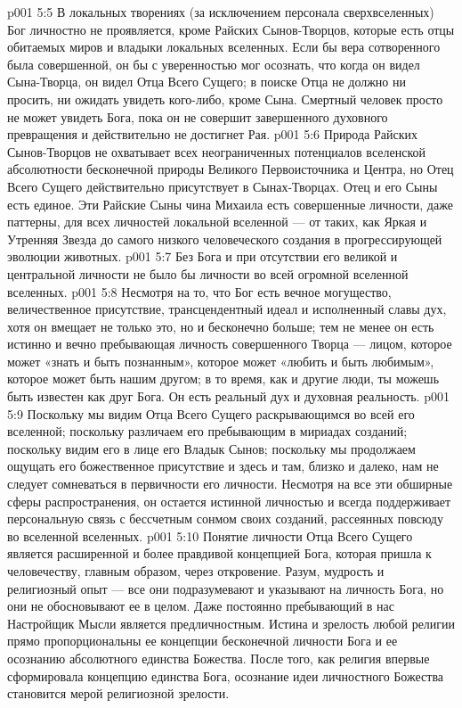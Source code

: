 \vs p001 5:5 \pc В локальных творениях (за исключением персонала сверхвселенных) Бог личностно не проявляется, кроме Райских Сынов\hyp{}Творцов, которые есть отцы обитаемых миров и владыки локальных вселенных. Если бы вера сотворенного была совершенной, он бы с уверенностью мог осознать, что когда он видел Сына\hyp{}Творца, он видел Отца Всего Сущего; в поиске Отца не должно ни просить, ни ожидать увидеть кого\hyp{}либо, кроме Сына. Смертный человек просто не может увидеть Бога, пока он не совершит завершенного духовного превращения и действительно не достигнет Рая.
\vs p001 5:6 Природа Райских Сынов\hyp{}Творцов не охватывает всех неограниченных потенциалов вселенской абсолютности бесконечной природы Великого Первоисточника и Центра, но Отец Всего Сущего действительно  присутствует в Сынах\hyp{}Творцах. Отец и его Сыны есть единое. Эти Райские Сыны чина Михаила есть совершенные личности, даже паттерны, для всех личностей локальной вселенной --- от таких, как Яркая и Утренняя Звезда до самого низкого человеческого создания в прогрессирующей эволюции животных.
\vs p001 5:7 \pc Без Бога и при отсутствии его великой и центральной личности не было бы личности во всей огромной вселенной вселенных. 
\vs p001 5:8 \pc Несмотря на то, что Бог есть вечное могущество, величественное присутствие, трансцендентный идеал и исполненный славы дух, хотя он вмещает не только это, но и бесконечно больше; тем не менее он есть истинно и вечно пребывающая личность совершенного Творца --- лицом, которое может «знать и быть познанным», которое может «любить и быть любимым», которое может быть нашим другом; в то время, как и другие люди, ты можешь быть известен как друг Бога. Он есть реальный дух и духовная реальность.
\vs p001 5:9 Поскольку мы видим Отца Всего Сущего раскрывающимся во всей его вселенной; поскольку различаем его пребывающим в мириадах созданий; поскольку видим его в лице его Владык Сынов; поскольку мы продолжаем ощущать его божественное присутствие и здесь и там, близко и далеко, нам не следует сомневаться в первичности его личности. Несмотря на все эти обширные сферы распространения, он остается истинной личностью и всегда поддерживает персональную связь с бессчетным сонмом своих созданий, рассеянных повсюду во вселенной вселенных.
\vs p001 5:10 \pc Понятие личности Отца Всего Сущего является расширенной и более правдивой концепцией Бога, которая пришла к человечеству, главным образом, через откровение. Разум, мудрость и религиозный опыт --- все они подразумевают и указывают на личность Бога, но они не обосновывают ее в целом. Даже постоянно пребывающий в нас Настройщик Мысли является предличностным. Истина и зрелость любой религии прямо пропорциональны ее концепции бесконечной личности Бога и ее осознанию абсолютного единства Божества. После того, как религия впервые сформировала концепцию единства Бога, осознание идеи личностного Божества становится мерой религиозной зрелости.
